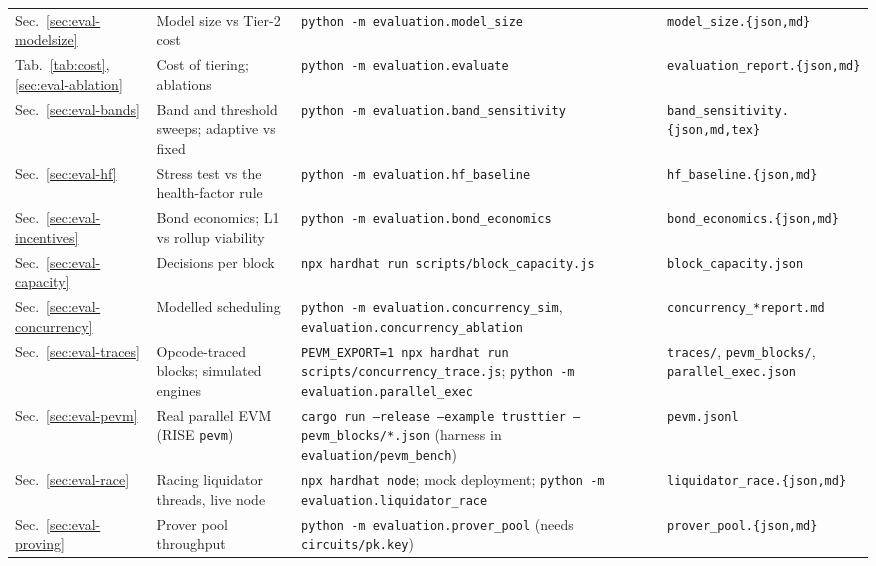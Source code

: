 \documentclass[sigconf,nonacm]{acmart}
\newcommand{\code}[1]{\texttt{\smaller #1}}
\begin{document}
\begin{table}[t]
\begin{tabularx}{\textwidth}{@{}p{1.9cm}P{4.0cm}LP{3.9cm}@{}}
    Sec.~\ref{sec:eval-modelsize} & Model size vs Tier-2 cost & \code{python -m evaluation.model\_size} & \code{model\_size.\{json,md\}} \\
    Tab.~\ref{tab:cost}, \ref{sec:eval-ablation} & Cost of tiering; ablations & \code{python -m evaluation.evaluate} & \code{evaluation\_report.\{json,md\}} \\
    Sec.~\ref{sec:eval-bands} & Band and threshold sweeps; adaptive vs fixed & \code{python -m evaluation.band\_sensitivity} & \code{band\_sensitivity.\{json,md,tex\}} \\
    Sec.~\ref{sec:eval-hf} & Stress test vs the health-factor rule & \code{python -m evaluation.hf\_baseline} & \code{hf\_baseline.\{json,md\}} \\
    Sec.~\ref{sec:eval-incentives} & Bond economics; L1 vs rollup viability & \code{python -m evaluation.bond\_economics} & \code{bond\_economics.\{json,md\}} \\
    Sec.~\ref{sec:eval-capacity} & Decisions per block & \code{npx hardhat run scripts/block\_capacity.js} & \code{block\_capacity.json} \\
    Sec.~\ref{sec:eval-concurrency} & Modelled scheduling & \code{python -m evaluation.concurrency\_sim}, \code{evaluation.concurrency\_ablation} & \code{concurrency\_*report.md} \\
    Sec.~\ref{sec:eval-traces} & Opcode-traced blocks; simulated engines & \code{PEVM\_EXPORT=1 npx hardhat run scripts/concurrency\_trace.js}; \code{python -m evaluation.parallel\_exec} & \code{traces/}, \code{pevm\_blocks/}, \code{parallel\_exec.json} \\
    Sec.~\ref{sec:eval-pevm} & Real parallel EVM (RISE \code{pevm}) & \code{cargo run --release --example trusttier -- pevm\_blocks/*.json} (harness in \code{evaluation/pevm\_bench}) & \code{pevm.jsonl} \\
    Sec.~\ref{sec:eval-race} & Racing liquidator threads, live node & \code{npx hardhat node}; mock deployment; \code{python -m evaluation.liquidator\_race} & \code{liquidator\_race.\{json,md\}} \\
    Sec.~\ref{sec:eval-proving} & Prover pool throughput & \code{python -m evaluation.prover\_pool} (needs \code{circuits/pk.key}) & \code{prover\_pool.\{json,md\}} \\
    \bottomrule
  \end{tabularx}
\end{table}
\end{document}
